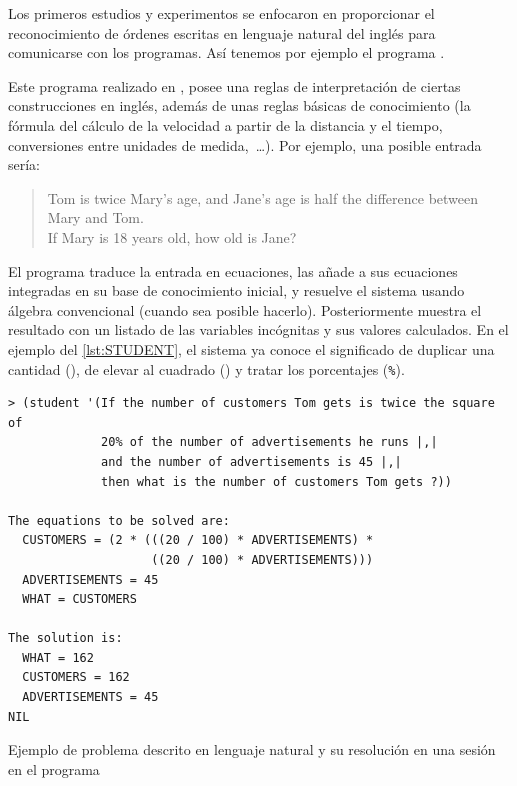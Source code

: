 Los primeros estudios y experimentos se enfocaron en proporcionar el reconocimiento de órdenes escritas en lenguaje natural del inglés para comunicarse con los programas. Así tenemos por ejemplo el programa  \citep{Bobrow1964}.

Este programa realizado en , posee una reglas de interpretación de ciertas construcciones en inglés, además de unas reglas básicas de conocimiento (la fórmula del cálculo de la velocidad a partir de la distancia y el tiempo, conversiones entre unidades de medida,~\ldots). Por ejemplo, una posible entrada sería:
\foreignblockquote{english}{Tom is twice Mary's age, and Jane's age is half the difference between \\
Mary and Tom.\\
If Mary is 18 years old, how old is Jane?}

El programa traduce la entrada en ecuaciones, las añade a sus ecuaciones integradas en su base de conocimiento inicial, y resuelve el sistema usando álgebra convencional (cuando sea posible hacerlo). Posteriormente muestra el resultado con un listado de las variables incógnitas y sus valores calculados. En el ejemplo del \autoref{lst:STUDENT}, el sistema ya conoce el significado de duplicar una cantidad (), de elevar al cuadrado () y tratar los porcentajes (\verb=%=).

\begin{listing}[htbp]
\begin{verbatim}
> (student '(If the number of customers Tom gets is twice the square of
             20% of the number of advertisements he runs |,|
             and the number of advertisements is 45 |,|
             then what is the number of customers Tom gets ?))

The equations to be solved are:
  CUSTOMERS = (2 * (((20 / 100) * ADVERTISEMENTS) *
                    ((20 / 100) * ADVERTISEMENTS)))
  ADVERTISEMENTS = 45
  WHAT = CUSTOMERS

The solution is:
  WHAT = 162
  CUSTOMERS = 162
  ADVERTISEMENTS = 45
NIL
\end{verbatim}
\caption[Ejemplo de problema descrito en lenguaje natural y su resolución en una sesión en el programa ]{Ejemplo de problema descrito en lenguaje natural y su resolución en una sesión en el programa  \citep{Norvig2014}}
\label{lst:STUDENT}
\end{listing}

